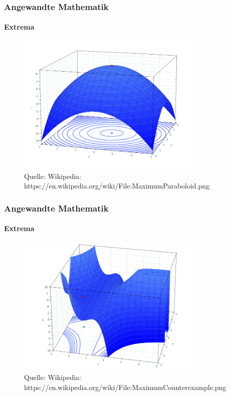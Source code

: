 \documentclass{beamer}
\begin{document}
\begin{frame}
    \frametitle{Angewandte Mathematik}
\framesubtitle{Extrema}

\begin{figure}[H]
      \centering
    \includegraphics[width=0.8\textwidth]{images/MaximumParaboloid}
      \caption{Quelle: Wikipedia: https://en.wikipedia.org/wiki/File:MaximumParaboloid.png}
   \end{figure}
 \end{frame}

\begin{frame}
    \frametitle{Angewandte Mathematik}
\framesubtitle{Extrema}

\begin{figure}[H]
      \centering
    \includegraphics[width=0.8\textwidth]{images/MaximumCounterexample}
      \caption{Quelle: Wikipedia: https://en.wikipedia.org/wiki/File:MaximumCounterexample.png}
\end{figure}
 \end{frame}
\end{document}
